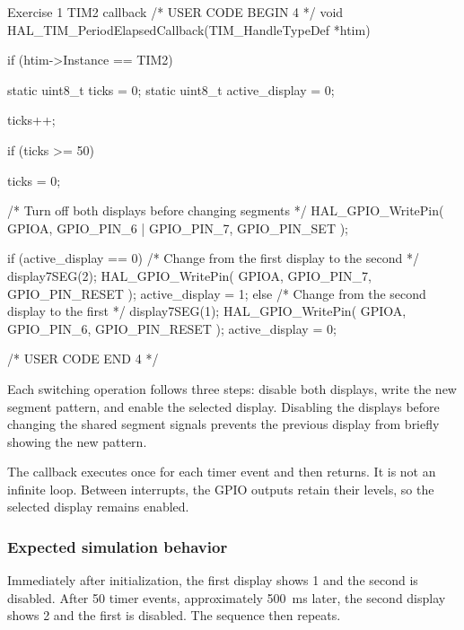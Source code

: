 \documentclass[a4paper]{article}
\begin{document}
\begin{stmcode}{Exercise 1 TIM2 callback}
/* USER CODE BEGIN 4 */
void HAL_TIM_PeriodElapsedCallback(TIM_HandleTypeDef *htim){
    if (htim->Instance == TIM2)
    {
        static uint8_t ticks = 0;
        static uint8_t active_display = 0;

        ticks++;

        if (ticks >= 50)
        {
            ticks = 0;

            /* Turn off both displays before changing segments */
            HAL_GPIO_WritePin(
                GPIOA,
                GPIO_PIN_6 | GPIO_PIN_7,
                GPIO_PIN_SET
            );

            if (active_display == 0)
            {
                /* Change from the first display to the second */
                display7SEG(2);
                HAL_GPIO_WritePin(
                    GPIOA, GPIO_PIN_7, GPIO_PIN_RESET
                );
                active_display = 1;
            }
            else
            {
                /* Change from the second display to the first */
                display7SEG(1);
                HAL_GPIO_WritePin(
                    GPIOA, GPIO_PIN_6, GPIO_PIN_RESET
                );
                active_display = 0;
            }
        }
    }
  }
/* USER CODE END 4 */
\end{stmcode}

Each switching operation follows three steps:
disable both displays, write the new segment pattern,
and enable the selected display. Disabling the displays
before changing the shared segment signals prevents
the previous display from briefly showing the new pattern.

The callback executes once for each timer event and
then returns. It is not an infinite loop. Between
interrupts, the GPIO outputs retain their levels,
so the selected display remains enabled.

\subsubsection{Expected simulation behavior}

Immediately after initialization, the first display
shows 1 and the second is disabled. After 50 timer
events, approximately 500~ms later, the second
display shows 2 and the first is disabled.
The sequence then repeats.
\end{document}
